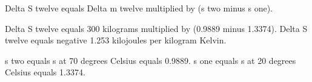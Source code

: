 Delta S twelve equals Delta m twelve multiplied by (s two minus s one).  

Delta S twelve equals 300 kilograms multiplied by (0.9889 minus 1.3374).  
Delta S twelve equals negative 1.253 kilojoules per kilogram Kelvin.  

s two equals s at 70 degrees Celsius equals 0.9889.  
s one equals s at 20 degrees Celsius equals 1.3374.